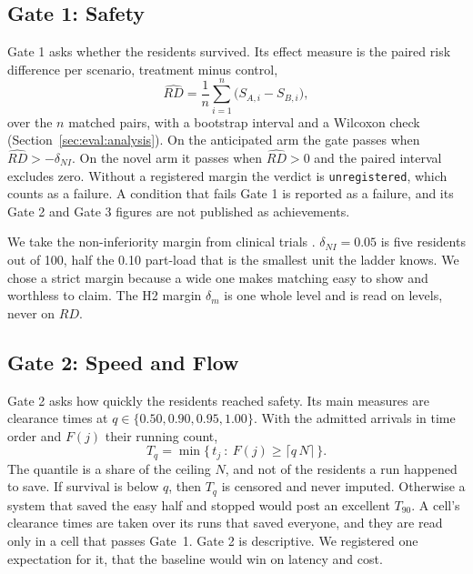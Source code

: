 

\subsection{Gate 1: Safety}
\label{sec:eval:gate1}

Gate 1 asks whether the residents survived. Its effect measure is the paired
risk difference per scenario, treatment minus control,
\begin{equation}
\widehat{RD} = \frac{1}{n}\sum_{i=1}^{n} \big(S_{A,i} - S_{B,i}\big),
\label{eq:eval:rd}
\end{equation}
over the $n$ matched pairs, with a bootstrap interval and a Wilcoxon check
(Section~\ref{sec:eval:analysis}). On the anticipated arm the gate passes when
$\widehat{RD} > -\delta_{NI}$. On the novel arm it passes when
$\widehat{RD} > 0$ and the paired interval excludes zero. Without a registered
margin the verdict is \texttt{unregistered}, which counts as a failure. A
condition that fails Gate 1 is reported as a failure, and its Gate 2 and Gate 3
figures are not published as achievements.

We take the non-inferiority margin from clinical trials \parencite{piaggio2012}.
$\delta_{NI} = 0.05$ is five residents out of 100, half the 0.10 part-load that
is the smallest unit the ladder knows. We chose a strict margin because a wide
one makes matching easy to show and worthless to claim. The H2 margin
$\delta_m$ is one whole level and is read on levels, never on $RD$.

\subsection{Gate 2: Speed and Flow}
\label{sec:eval:gate2}

Gate 2 asks how quickly the residents reached safety. Its main measures are
clearance times at $q \in \{0.50, 0.90, 0.95, 1.00\}$. With the admitted
arrivals in time order and $F(j)$ their running count,
\begin{equation}
T_q = \min\big\{\, t_j \ :\ F(j) \geq \lceil q\,N \rceil \,\big\}.
\label{eq:eval:tq}
\end{equation}
The quantile is a share of the ceiling $N$, and not of the residents a run
happened to save. If survival is below $q$, then $T_q$ is censored and never
imputed. Otherwise a system that saved the easy half and stopped would post an
excellent $T_{90}$. A cell's clearance times are taken over its runs that
saved everyone, and they are read only in a cell that passes Gate~1. Gate 2 is
descriptive. We registered one expectation for it, that the baseline would win
on latency and cost.

